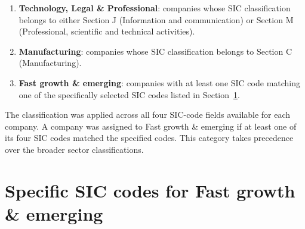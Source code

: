 \documentclass[ %
                    author={Daniel Page},
                supervisor={Dr. Andrew Calway},
                    degree={MSc},
                     title={Some Structural Guidelines for Data Science MSc Theses, Including Those With Long Titles that Run Across Multiple Lines on the Front Page},
                  subtitle={And those including an optional subtitle too, for good measure},
                      type={},
                      year={2021}]{dissertation}
\begin{document}
\begin{enumerate}
    \item \textbf{Technology, Legal \& Professional}: companies whose SIC
    classification belongs to either Section J (Information and communication)
    or Section M (Professional, scientific and technical activities).

    \item \textbf{Manufacturing}: companies whose SIC classification belongs
    to Section C (Manufacturing).

    \item \textbf{Fast growth \& emerging}: companies with at least one SIC
    code matching one of the specifically selected SIC codes listed in
    Section~\ref{app:sic-specific-codes}.
\end{enumerate}

The classification was applied across all four SIC-code fields available for
each company. A company was assigned to Fast growth \& emerging if at least
one of its four SIC codes matched the specified codes. This category takes
precedence over the broader sector classifications.

\section{Specific SIC codes for Fast growth \& emerging}
\label{app:sic-specific-codes}
\end{document}

